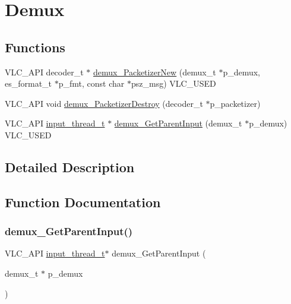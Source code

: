\hypertarget{group__demux}{}\section{Demux}
\label{group__demux}
\subsection*{Functions}
\begin{DoxyCompactItemize}
\item 
V\+L\+C\+\_\+\+A\+PI decoder\+\_\+t $\ast$ \hyperlink{group__demux_ga918379bccc4f76159fefd3230890e09e}{demux\+\_\+\+Packetizer\+New} (demux\+\_\+t $\ast$p\+\_\+demux, es\+\_\+format\+\_\+t $\ast$p\+\_\+fmt, const char $\ast$psz\+\_\+msg) V\+L\+C\+\_\+\+U\+S\+ED
\item 
V\+L\+C\+\_\+\+A\+PI void \hyperlink{group__demux_ga67bbb8bff77333e401f3aece9ce180e8}{demux\+\_\+\+Packetizer\+Destroy} (decoder\+\_\+t $\ast$p\+\_\+packetizer)
\item 
V\+L\+C\+\_\+\+A\+PI \hyperlink{structinput__thread__t}{input\+\_\+thread\+\_\+t} $\ast$ \hyperlink{group__demux_ga2903ac467ec14cffe740584d0091c246}{demux\+\_\+\+Get\+Parent\+Input} (demux\+\_\+t $\ast$p\+\_\+demux) V\+L\+C\+\_\+\+U\+S\+ED
\end{DoxyCompactItemize}


\subsection{Detailed Description}


\subsection{Function Documentation}
\mbox{\label{group__demux_ga2903ac467ec14cffe740584d0091c246}} 
\subsubsection{\texorpdfstring{demux\+\_\+\+Get\+Parent\+Input()}{demux\_GetParentInput()}}
{\footnotesize\ttfamily V\+L\+C\+\_\+\+A\+PI \hyperlink{structinput__thread__t}{input\+\_\+thread\+\_\+t}$\ast$ demux\+\_\+\+Get\+Parent\+Input (\begin{DoxyParamCaption}\item[{demux\+\_\+t $\ast$}]{p\+\_\+demux }\end{DoxyParamCaption})}

